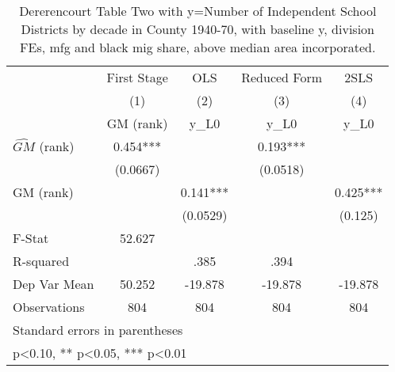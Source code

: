 \begin{table}[htbp]\centering
\def\sym#1{\ifmmode^{#1}\else\(^{#1}\)\fi}
\caption{Dererencourt Table Two with y=Number of Independent School Districts by decade in County 1940-70, with baseline y, division FEs, mfg and black mig share, above median area incorporated.}
\begin{tabular}{l*{4}{c}}
\toprule
                    & First Stage   &         OLS   &Reduced Form   &        2SLS   \\
                    &\multicolumn{1}{c}{(1)}&\multicolumn{1}{c}{(2)}&\multicolumn{1}{c}{(3)}&\multicolumn{1}{c}{(4)}\\
                    &\multicolumn{1}{c}{GM  (rank)}&\multicolumn{1}{c}{y\_L0}&\multicolumn{1}{c}{y\_L0}&\multicolumn{1}{c}{y\_L0}\\
\midrule
$\hat{GM}$ (rank)   &       0.454***&               &       0.193***&               \\
                    &    (0.0667)   &               &    (0.0518)   &               \\
\addlinespace
GM  (rank)          &               &       0.141***&               &       0.425***\\
                    &               &    (0.0529)   &               &     (0.125)   \\
\midrule
F-Stat              &      52.627   &               &               &               \\
R-squared           &               &        .385   &        .394   &               \\
Dep Var Mean        &      50.252   &     -19.878   &     -19.878   &     -19.878   \\
Observations        &         804   &         804   &         804   &         804   \\
\bottomrule
\multicolumn{5}{l}{\footnotesize Standard errors in parentheses}\\
\multicolumn{5}{l}{\footnotesize * p<0.10, ** p<0.05, *** p<0.01}\\
\end{tabular}
\end{table}
